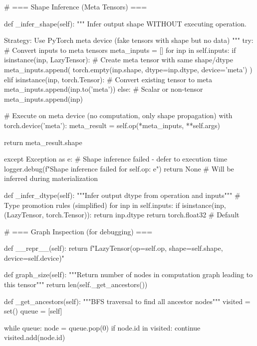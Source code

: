     # === Shape Inference (Meta Tensors) ===
    
    def _infer_shape(self):
        """
        Infer output shape WITHOUT executing operation.
        
        Strategy: Use PyTorch meta device (fake tensors with shape but no data)
        """
        try:
            # Convert inputs to meta tensors
            meta_inputs = []
            for inp in self.inputs:
                if isinstance(inp, LazyTensor):
                    # Create meta tensor with same shape/dtype
                    meta_inputs.append(
                        torch.empty(inp.shape, dtype=inp.dtype, device='meta')
                    )
                elif isinstance(inp, torch.Tensor):
                    # Convert existing tensor to meta
                    meta_inputs.append(inp.to('meta'))
                else:
                    # Scalar or non-tensor
                    meta_inputs.append(inp)
            
            # Execute on meta device (no computation, only shape propagation)
            with torch.device('meta'):
                meta_result = self.op(*meta_inputs, **self.args)
            
            return meta_result.shape
        
        except Exception as e:
            # Shape inference failed - defer to execution time
            logger.debug(f"Shape inference failed for {self.op}: {e}")
            return None  # Will be inferred during materialization
    
    def _infer_dtype(self):
        """Infer output dtype from operation and inputs"""
        # Type promotion rules (simplified)
        for inp in self.inputs:
            if isinstance(inp, (LazyTensor, torch.Tensor)):
                return inp.dtype
        return torch.float32  # Default
    
    # === Graph Inspection (for debugging) ===
    
    def __repr__(self):
        return f"LazyTensor(op={self.op}, shape={self.shape}, device={self.device})"
    
    def graph_size(self):
        """Return number of nodes in computation graph leading to this tensor"""
        return len(self._get_ancestors())
    
    def _get_ancestors(self):
        """BFS traversal to find all ancestor nodes"""
        visited = set()
        queue = [self]
        
        while queue:
            node = queue.pop(0)
            if node.id in visited:
                continue
            visited.add(node.id)
            
